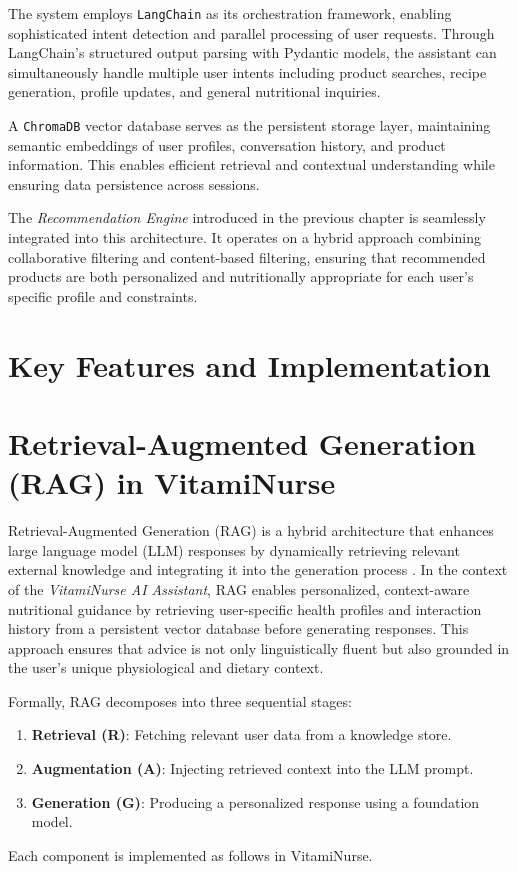 The system employs \texttt{LangChain} as its orchestration framework, enabling sophisticated intent detection and parallel processing of user requests. Through LangChain's structured output parsing with Pydantic models, the assistant can simultaneously handle multiple user intents including product searches, recipe generation, profile updates, and general nutritional inquiries.

A \texttt{ChromaDB} vector database serves as the persistent storage layer, maintaining semantic embeddings of user profiles, conversation history, and product information. This enables efficient retrieval and contextual understanding while ensuring data persistence across sessions.

The \emph{Recommendation Engine} introduced in the previous chapter is seamlessly integrated into this architecture. It operates on a hybrid approach combining collaborative filtering and content-based filtering, ensuring that recommended products are both personalized and nutritionally appropriate for each user's specific profile and constraints.

\section{Key Features and Implementation}

\section{Retrieval-Augmented Generation (RAG) in VitamiNurse}
\label{sec:rag}

Retrieval-Augmented Generation (RAG) is a hybrid architecture that enhances large language model (LLM) responses by dynamically retrieving relevant external knowledge and integrating it into the generation process \cite{lewis2020retrieval}. In the context of the \textit{VitamiNurse AI Assistant}, RAG enables personalized, context-aware nutritional guidance by retrieving user-specific health profiles and interaction history from a persistent vector database before generating responses. This approach ensures that advice is not only linguistically fluent but also grounded in the user’s unique physiological and dietary context.

Formally, RAG decomposes into three sequential stages:
\begin{enumerate}
    \item \textbf{Retrieval (R)}: Fetching relevant user data from a knowledge store.
    \item \textbf{Augmentation (A)}: Injecting retrieved context into the LLM prompt.
    \item \textbf{Generation (G)}: Producing a personalized response using a foundation model.
\end{enumerate}
Each component is implemented as follows in VitamiNurse.

